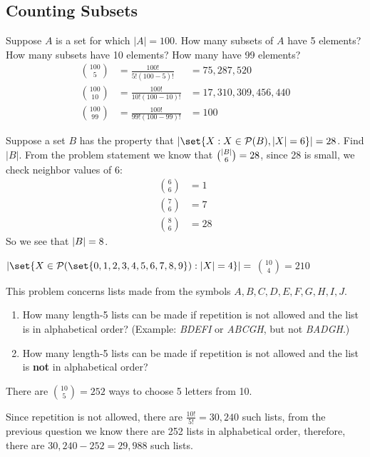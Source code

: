 \documentclass[DIN, pagenumber=false, fontsize=11pt, parskip=half]{scrartcl}
\begin{document}
\subsection{Counting Subsets}

\begin{problems}
    \problem Suppose $A$ is a set for which $|A| = 100$. How many subsets of $A$ have 5 elements? How many subsets have 10 elements? How many have 99 elements?
    \answer
    \begin{align}
        \nonumber {100 \choose 5} & = \frac{100!}{5!(100-5)!} & = 75,287,520\\ 
        \nonumber {100 \choose 10} & = \frac{100!}{10!(100-10)!} & = 17,310,309,456,440\\ 
        \nonumber {100 \choose 99} & = \frac{100!}{99!(100-99)!} & = 100
    \end{align}


    \problem Suppose a set $B$ has the property that $|\set{X : X \in \mathcal{P}(B),|X| = 6}| = 28$. Find $|B|$.
    \answer From the problem statement we know that ${\lvert B \rvert \choose 6} = 28$, since 28 is small, we check neighbor values of 6:
    \begin{align}
        \nonumber {6 \choose 6} & = 1\\ 
        \nonumber {7 \choose 6} & = 7\\ 
        \nonumber {8 \choose 6} & = 28
    \end{align}
    So we see that $\lvert B \rvert = 8$.

    \problem $|\set{X \in \mathcal{P}(\set{0,1,2,3,4,5,6,7,8,9}) : |X| = 4}| = $
    \answer ${10 \choose 4} = 210$

    \problem This problem concerns lists made from the symbols $A,\allowbreak B,\allowbreak C,\allowbreak D,\allowbreak E,\allowbreak F,\allowbreak G,\allowbreak H,\allowbreak I,\allowbreak J$.
    \begin{enumerate}[label=\alph*)]
        \item How many length-5 lists can be made if repetition is not allowed and the list is in alphabetical order? (Example: \textit{BDEFI} or \textit{ABCGH}, but not \textit{BADGH}.)
        \item How many length-5 lists can be made if repetition is not allowed and the list is \textbf{not} in alphabetical order?
    \end{enumerate}
    \answer
    \begin{parts}
    \item There are ${10 \choose 5} = 252$ ways to choose 5 letters from 10.
    \item Since repetition is not allowed, there are $\frac{10!}{5!} = 30,240$ such lists, from the previous question we know there are 252 lists in alphabetical order, therefore, there are $30,240 - 252 = 29,988$ such lists.
    \end{parts}


\end{problems}
\end{document}

